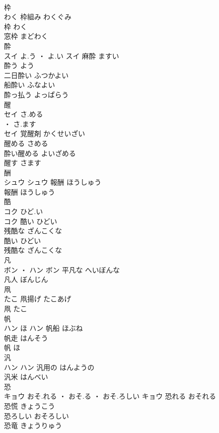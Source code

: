 \documentclass[8pt]{extreport}
\begin{document}
\begin{CJK}{UTF8}{min}
\\	枠	
\\	わく		枠組み	わくぐみ	
\\	枠	わく	
\\	窓枠	まどわく	
\\	酔	
\\	スイ	よ.う ・ よ.い	スイ	麻酔	ますい	
\\	酔う	よう	
\\	二日酔い	ふつかよい	
\\	船酔い	ふなよい	
\\	酔っ払う	よっぱらう	
\\	醒	
\\	セイ	さ.める
\\	・ さ.ます
\\	セイ	覚醒剤	かくせいざい	
\\	醒める	さめる	
\\	酔い醒める	よいざめる	
\\	醒す	さます	
\\	酬	
\\	シュウ		シュウ	報酬	ほうしゅう	
\\	報酬	ほうしゅう	
\\	酷	
\\	コク	ひど.い
\\	コク	酷い	ひどい	
\\	残酷な	ざんこくな	
\\	酷い	ひどい	
\\	残酷な	ざんこくな	
\\	凡	
\\	ボン ・ ハン		ボン	平凡な	へいぼんな	
\\	凡人	ぼんじん	
\\	凧	
\\	たこ														凧揚げ	たこあげ	
\\	凧	たこ	
\\	帆	
\\	ハン	ほ	ハン	帆船	ほぶね	
\\	帆走	はんそう	
\\	帆	ほ	
\\	汎	
\\	ハン		ハン	汎用の	はんようの	
\\	汎米	はんべい	
\\	恐	
\\	キョウ	おそ.れる ・ おそ.る ・ おそ.ろしい	キョウ	恐れる	おそれる	
\\	恐慌	きょうこう	
\\	恐ろしい	おそろしい	
\\	恐竜	きょうりゅう	

\end{CJK}
\end{document}
